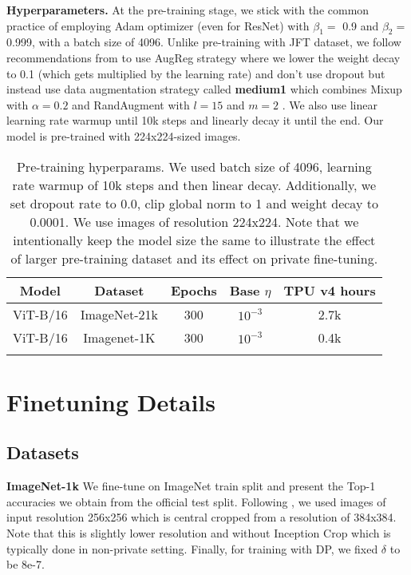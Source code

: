 \documentclass[letterpaper]{article} \usepackage{fullpage}
\begin{document}
\textbf{Hyperparameters.}
At the pre-training stage, we stick with the common practice of employing Adam optimizer (even for ResNet) with $\beta_1=$ 0.9 and $\beta_2 =$ 0.999, with a batch size of 4096. Unlike pre-training with JFT dataset, we follow recommendations from \cite{augreg_steiner2021train} to use AugReg strategy where we lower the weight decay to 0.1 (which gets multiplied by the learning rate) and don't use dropout but instead use data augmentation strategy called \textbf{medium1} which combines Mixup with $\alpha=0.2$ \citep{zhang2017mixup} and RandAugment with $l=15$ and $m=2$ \citep{randugment2020}. We also use linear learning rate warmup until 10k steps and linearly decay it until the end. Our model is pre-trained with 224x224-sized images.

\begin{table}[H]
    \centering
\begin{tabular}{c|c|c|c|c}
    \toprule
        Model & Dataset & Epochs & Base $\eta$ & TPU v4 hours\\
        \midrule
      ViT-B/16 & ImageNet-21k & 300 & $10^{-3}$ & 2.7k \\
      ViT-B/16 & Imagenet-1K & 300 & $10^{-3}$ & 0.4k \\
         \bottomrule
         \addlinespace[0.3cm]
    \end{tabular}
        \caption{Pre-training hyperparams. We used batch size of 4096, learning rate warmup of 10k steps and then linear decay. Additionally, we set dropout rate to 0.0, clip global norm to 1 and weight decay to 0.0001. We use images of resolution 224x224. Note that we intentionally keep the model size the same to illustrate the effect of larger pre-training dataset and its effect on private fine-tuning.}
            \label{tab:learning_rate}
\end{table}

\section{Finetuning Details}

\subsection{Datasets}

\textbf{ImageNet-1k} We fine-tune on ImageNet train split and present the Top-1 accuracies we obtain from the official test split. Following \cite{mehta2022large}, we used images of input resolution 256x256 which is central cropped from a resolution of 384x384. Note that this is slightly lower resolution and without Inception Crop \citep{Szegedy2015GoingDW_inception} which is typically done in non-private setting. Finally, for training with DP, we fixed $\delta$ to be 8e-7.
\end{document}
